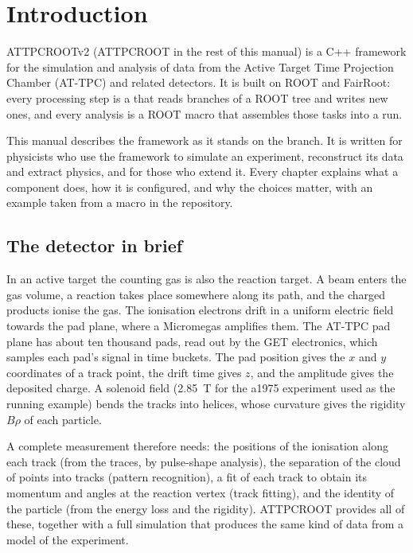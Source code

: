\chapter{Introduction}
\label{ch:introduction}

ATTPCROOTv2 (ATTPCROOT in the rest of this manual) is a C++ framework for the simulation and analysis of
data from the Active Target Time Projection Chamber (AT-TPC) and related detectors. It is built on ROOT and
FairRoot: every processing step is a  that reads branches of a ROOT tree and writes new ones, and
every analysis is a ROOT macro that assembles those tasks into a run.

This manual describes the framework as it stands on the  branch. It is written for physicists who
use the framework to simulate an experiment, reconstruct its data and extract physics, and for those who extend it.
Every chapter explains what a component does, how it is configured, and why the choices matter, with an example
taken from a macro in the repository.

\section{The detector in brief}

In an active target the counting gas is also the reaction target. A beam enters the gas volume, a reaction takes
place somewhere along its path, and the charged products ionise the gas. The ionisation electrons drift in a uniform
electric field towards the pad plane, where a Micromegas amplifies them. The AT-TPC pad plane has about ten thousand
pads, read out by the GET electronics, which samples each pad's signal in time buckets. The pad position gives the
$x$ and $y$ coordinates of a track point, the drift time gives $z$, and the amplitude gives the deposited charge. A
solenoid field (2.85~T for the a1975 experiment used as the running example) bends the tracks into helices, whose
curvature gives the rigidity $B\rho$ of each particle.

A complete measurement therefore needs: the positions of the ionisation along each track (from the traces, by
pulse-shape analysis), the separation of the cloud of points into tracks (pattern recognition), a fit of each track
to obtain its momentum and angles at the reaction vertex (track fitting), and the identity of the particle (from the
energy loss and the rigidity). ATTPCROOT provides all of these, together with a full simulation that produces the
same kind of data from a model of the experiment.

